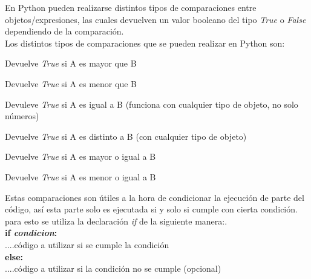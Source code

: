 \documentclass[10pt,a4paper]{article}
\begin{document}
	En Python pueden realizarse distintos tipos de comparaciones entre objetos/expresiones, las cuales devuelven un valor booleano del tipo \emph{True} o \emph{False} dependiendo de la comparación.\\
	Los distintos tipos de comparaciones que se pueden realizar en Python son:\\
	\begin{description}[leftmargin=!, labelwidth=2.5cm,itemindent=0cm]
		\item [A $>$ B] Devuelve \emph{True} si A es mayor que B
		\item [A $<$ B] Devuelve \emph{True} si A es menor que B
		\item [A == B] Devuleve \emph{True} si A es igual a B (funciona con cualquier tipo de objeto, no solo números)
		\item [A != B] Devuelve \emph{True} si A es distinto a B (con cualquier tipo de objeto) 
		\item [A $>=$ B] Devuelve \emph{True} si A es mayor o igual a B
		\item [A $<=$ B] Devuelve \emph{True} si A es menor o igual a B
	\end{description}

\noindent Estas comparaciones son útiles a la hora de condicionar la ejecución de parte del código, así esta parte solo es ejecutada si y solo si cumple con cierta condición. para esto se utiliza la declaración \emph{if} de la siguiente manera:.\\
	\textbf{if \emph{condicion}:}\\
	....código a utilizar si se cumple la condición\\
	\textbf{else:}\\
	....código a utilizar si la condición no se cumple (opcional)\\
\end{document}
